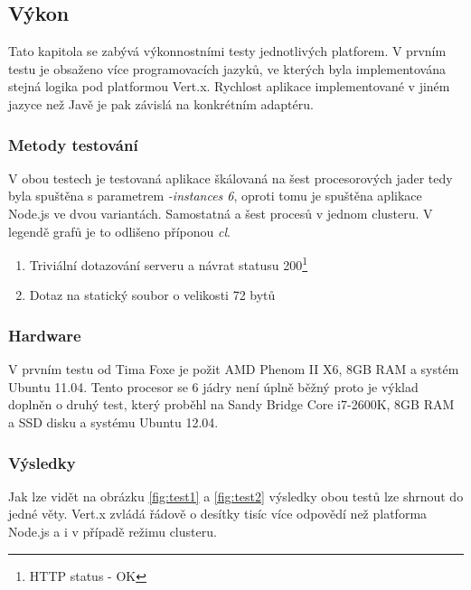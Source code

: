 \subsection{Výkon}\label{sub:performence}

Tato kapitola se zabývá výkonnostními testy jednotlivých platforem. V prvním testu je obsaženo více programovacích jazyků, ve kterých byla implementována stejná logika pod platformou Vert.x. Rychlost aplikace implementované v jiném jazyce než Javě je pak závislá na konkrétním adaptéru.

\subsubsection{Metody testování}

V obou testech je testovaná aplikace škálovaná na šest procesorových jader tedy byla spuštěna s parametrem \emph{-instances 6}, oproti tomu je spuštěna aplikace Node.js ve dvou variantách. Samostatná a šest procesů v jednom clusteru. V legendě grafů je to odlišeno příponou \emph{cl}.

\begin{enumerate}
\item{Triviální dotazování serveru a návrat statusu 200\footnote{HTTP status - OK}}
\item{Dotaz na statický soubor o velikosti 72 bytů}
\end{enumerate}

\subsubsection{Hardware}

V prvním testu od Tima Foxe je požit  AMD Phenom II X6, 8GB RAM a systém Ubuntu 11.04. Tento procesor se 6 jádry není úplně běžný proto je výklad doplněn o druhý test, který proběhl na Sandy Bridge Core i7-2600K, 8GB RAM a SSD disku a systému Ubuntu 12.04.

\subsubsection{Výsledky}

Jak lze vidět na obrázku \ref{fig:test1} a \ref{fig:test2} výsledky obou testů lze shrnout do jedné věty. Vert.x zvládá řádově o desítky tisíc více odpovědí než platforma Node.js a i v případě režimu clusteru.

